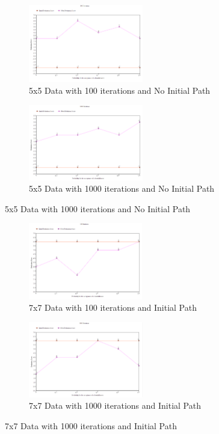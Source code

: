 \documentclass[11pt, oneside]{article}   	%
\begin{document}
\begin{figure}[H]
\centering
\begin{subfigure}{.5\textwidth}
	\centering
	\includegraphics[width=50mm]{5x5downPath.png}
	\caption{5x5 Data with 100 iterations and No Initial Path}
	\label{fig:method}
\end{subfigure}%
\begin{subfigure}{.5\textwidth}
	\centering
	\includegraphics[width=50mm]{5x5downPath2.png}
	\caption{5x5 Data with 1000 iterations and No Initial Path}
	\label{fig:method}
\end{subfigure}
\end{figure}

\begin{figure}[H]
\centering
\begin{subfigure}{.5\textwidth}
	\centering
	\includegraphics[width=50mm]{7x7down.png}
	\caption{7x7 Data with 100 iterations and Initial Path}
	\label{fig:method}
\end{subfigure}%
\begin{subfigure}{.5\textwidth}
	\centering
	\includegraphics[width=50mm]{7x7down2.png}
	\caption{7x7 Data with 1000 iterations and Initial Path}
	\label{fig:method}
\end{subfigure}
\end{figure}
\end{document}
